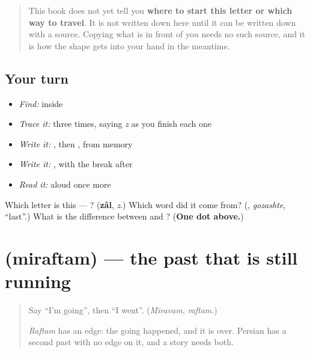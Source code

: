\begin{quote}
This book does not yet tell you \textbf{where to start this letter or which way to travel}. It is not written down here until it can be written down with a source. Copying what is in front of you needs no such source, and it is how the shape gets into your hand in the meantime.
\end{quote}

\subsection*{Your turn}
\begin{itemize}
\raggedright
  \item \emph{Find:}  inside \textbf{}
  \item \emph{Trace it:}  three times, saying \emph{z} as you finish each one
  \item \emph{Write it:} , then , from memory
  \item \emph{Write it:} \textbf{}, with the break after 
  \item \emph{Read it:} \textbf{} aloud once more
\end{itemize}

\begin{tcolorbox}[breakable,colback=teal!4,colframe=teal!35!black,title={Before you move on}]
Which letter is this — ? (\textbf{zâl}, \emph{z}.) Which word did it come from? (\textbf{}, \emph{gozashte}, \textquotedblleft{}last\textquotedblright{}.) What is the difference between  and ? (\textbf{One dot above.})
\end{tcolorbox}
\section[\texorpdfstring{\fa{میرفتم} (miraftam)}{میرفتم (miraftam)}]{ (miraftam) — the past that is still running}

\label{lesson:FA-C290-miraftam}



\begin{quote}
Say \textquotedblleft{}I'm going\textquotedblright{}, then \textquotedblleft{}I went\textquotedblright{}. (\emph{Miravam}, \emph{raftam}.)

\emph{Raftam} has an edge: the going happened, and it is over. Persian has a second past with no edge on it, and a story needs both.
\end{quote}

